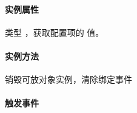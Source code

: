 \documentclass[letterpaper,10pt,english]{sphinxmanual}
\begin{document}
\paragraph{实例属性}
\label{api/component/dd/droppable:id3}

\begin{fulllineitems}
\label{api/component/dd/droppable:DD.Droppable.node}
类型  ，获取配置项的 {\hyperref[api/component/dd/droppable:DD.Droppable.config.node]{}} 值。

\end{fulllineitems}



\paragraph{实例方法}
\label{api/component/dd/droppable:id4}

\begin{fulllineitems}
\label{api/component/dd/droppable:DD.Droppable.destroy}
销毁可放对象实例，清除绑定事件

\end{fulllineitems}



\paragraph{触发事件}
\label{api/component/dd/droppable:id5}\label{api/component/dd/droppable:droppable-events}
\end{document}
